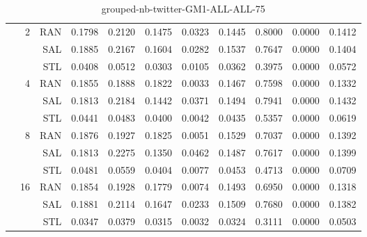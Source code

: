 \begin{center}
\begin{table}[htbp]
\begin{tabular}{ | r | r | r | r | r | r | r | r | r | r | r |}
 & \multirow{3}{*}{2} & RAN & 0.1798 & 0.2120 & 0.1475 & 0.0323 & 0.1445 & 0.8000 & 0.0000 & 0.1412\\ \cline{3-11}
 &   & SAL & 0.1885 & 0.2167 & 0.1604 & 0.0282 & 0.1537 & 0.7647 & 0.0000 & 0.1404\\ \cline{3-11}
 &   & STL & 0.0408 & 0.0512 & 0.0303 & 0.0105 & 0.0362 & 0.3975 & 0.0000 & 0.0572\\ \cline{2-11}
 & \multirow{3}{*}{4} & RAN & 0.1855 & 0.1888 & 0.1822 & 0.0033 & 0.1467 & 0.7598 & 0.0000 & 0.1332\\ \cline{3-11}
 &   & SAL & 0.1813 & 0.2184 & 0.1442 & 0.0371 & 0.1494 & 0.7941 & 0.0000 & 0.1432\\ \cline{3-11}
 &   & STL & 0.0441 & 0.0483 & 0.0400 & 0.0042 & 0.0435 & 0.5357 & 0.0000 & 0.0619\\ \cline{2-11}
 & \multirow{3}{*}{8} & RAN & 0.1876 & 0.1927 & 0.1825 & 0.0051 & 0.1529 & 0.7037 & 0.0000 & 0.1392\\ \cline{3-11}
 &   & SAL & 0.1813 & 0.2275 & 0.1350 & 0.0462 & 0.1487 & 0.7617 & 0.0000 & 0.1399\\ \cline{3-11}
 &   & STL & 0.0481 & 0.0559 & 0.0404 & 0.0077 & 0.0453 & 0.4713 & 0.0000 & 0.0709\\ \cline{2-11}
 & \multirow{3}{*}{16} & RAN & 0.1854 & 0.1928 & 0.1779 & 0.0074 & 0.1493 & 0.6950 & 0.0000 & 0.1318\\ \cline{3-11}
 &   & SAL & 0.1881 & 0.2114 & 0.1647 & 0.0233 & 0.1509 & 0.7680 & 0.0000 & 0.1382\\ \cline{3-11}
 &   & STL & 0.0347 & 0.0379 & 0.0315 & 0.0032 & 0.0324 & 0.3111 & 0.0000 & 0.0503\\ \cline{2-11}
\hline
\end{tabular}
\caption{grouped-nb-twitter-GM1-ALL-ALL-75}
\end{table}
\end{center}

